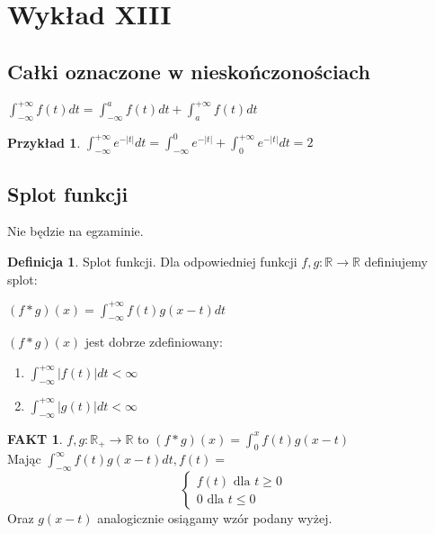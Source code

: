 \documentclass{article}
\theoremstyle{definition}
\newtheorem{de}{Definicja}[subsection]
\theoremstyle{definition}
\theoremstyle{definition}
\newtheorem{pk}{Przykład}[subsection]
\theoremstyle{definition}
\newtheorem*{fakt}{FAKT}
\begin{document}
\section{Wykład XIII}

\subsection{Całki oznaczone w nieskończonościach}

\begin{center}
    $\int_{-\infty}^{+\infty} f(t) dt = \int_{-\infty}^{a} f(t) dt + \int_{a}^{+\infty} f(t) dt$
\end{center}

\begin{pk}
    $\int_{-\infty}^{+\infty} e^{-|t|} dt = \int_{-\infty}^{0} e^{-|t|} + \int_{0}^{+\infty} e^{-|t|} dt = 2$
\end{pk}

\subsection{Splot funkcji}

Nie będzie na egzaminie.

\begin{de}
    Splot funkcji. Dla odpowiedniej funkcji $f,g: \mathbb{R}\rightarrow \mathbb{R}$ definiujemy splot:
    \begin{center}
        $(f*g)(x) = \int_{-\infty}^{+\infty} f(t)g(x-t) dt$
    \end{center}
    $(f*g)(x)$ jest dobrze zdefiniowany:
    \begin{enumerate}
        \item $\int_{-\infty}^{+\infty} |f(t)| dt < \infty$
        \item $\int_{-\infty}^{+\infty} |g(t)| dt < \infty$
    \end{enumerate}
\end{de}

\begin{fakt}
    $f,g: \mathbb{R}_+ \rightarrow \mathbb{R}$ to $(f*g)(x) = \int_{0}^{x} f(t)g(x-t)$\\
    Mając $\int_{-\infty}^{\infty} f(t) g(x-t) dt, f(t)=$
    $$\begin{cases}
        f(t)\text{ dla } t\geq 0\\
        0\text{ dla } t\leq 0
    \end{cases}$$
    Oraz $g(x-t)$ analogicznie osiągamy wzór podany wyżej.
\end{fakt}
\end{document}
